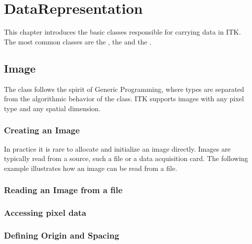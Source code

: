 
\chapter{DataRepresentation}
\label{sec:DataRepresentation}


This chapter introduces the basic classes responsible
for carrying data in ITK. The most common classes are the
, the  and the .

\section{Image}
\label{sec:ImageSection}

The  class follows the spirit of Generic Programming, where types
are separated from the algorithmic behavior of the class.  ITK supports images
with any pixel type and any spatial dimension.

\subsection{Creating an Image}\label{sec:CreatingAnImageSection}




In practice it is rare to allocate and initialize an image directly.
Images are typically read from a source, such a file or a data acquisition
card. The following example illustrates how an image can be read from
a file.




\subsection{Reading an Image from a file}
\label{sec:ReadingImageFromFile}







\subsection{Accessing pixel data}
\label{sec:AccessingImagePixelData}






\subsection{Defining Origin and Spacing}
\label{sec:DefiningImageOriginAndSpacing}

